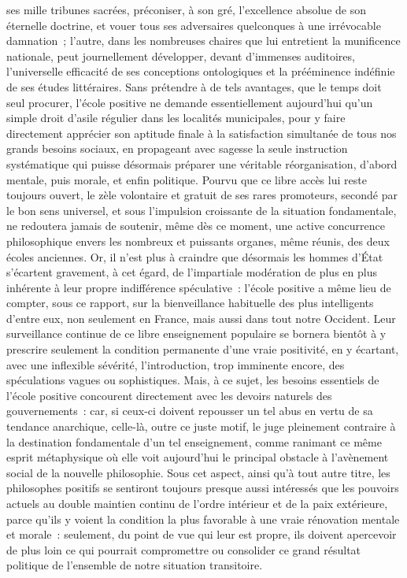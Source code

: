 \documentclass[french,twoside]{book} %
\begin{document}
ses mille tribunes sacrées, préconiser, à son gré, l’excellence absolue de son éternelle doctrine, et vouer tous ses adversaires quelconques à une irrévocable damnation ; l’autre, dans les nombreuses chaires que lui entretient la munificence nationale, peut journellement développer, devant d’immenses auditoires, l’universelle efficacité de ses conceptions ontologiques et la prééminence indéfinie de ses études littéraires. Sans prétendre à de tels avantages, que le temps doit seul procurer, l’école positive ne demande essentiellement aujourd’hui qu’un simple droit d’asile régulier dans les localités municipales, pour y faire directement apprécier son aptitude finale à la satisfaction simultanée de tous nos grands besoins sociaux, en propageant avec sagesse la seule instruction systématique qui puisse désormais préparer une véritable réorganisation, d’abord mentale, puis morale, et enfin politique. Pourvu que ce libre accès lui reste toujours ouvert, le zèle volontaire et gratuit de ses rares promoteurs, secondé par le bon sens universel, et sous l’impulsion croissante de la situation fondamentale, ne redoutera jamais de soutenir, même dès ce moment, une active concurrence philosophique envers les nombreux et puissants organes, même réunis, des deux écoles anciennes. Or, il n’est plus à craindre que désormais les hommes d’État s’écartent gravement, à cet égard, de l’impartiale modération de plus en plus inhérente à leur propre indifférence spéculative : l’école positive a même lieu de compter, sous ce rapport, sur la bienveillance habituelle des plus intelligents d’entre eux, non seulement en France, mais aussi dans tout notre Occident. Leur surveillance continue de ce libre enseignement populaire se bornera bientôt à y prescrire seulement la condition permanente d’une vraie positivité, en y écartant, avec une inflexible sévérité, l’introduction, trop imminente encore, des spéculations vagues ou sophistiques. Mais, à ce sujet, les besoins essentiels de l’école positive concourent directement avec les devoirs naturels des gouvernements : car, si ceux-ci doivent repousser un tel abus en vertu de sa tendance anarchique, celle-là, outre ce juste motif, le juge pleinement contraire à la destination fondamentale d’un tel enseignement, comme ranimant ce même esprit métaphysique où elle voit aujourd’hui le principal obstacle à l’avènement social de la nouvelle philosophie. Sous cet aspect, ainsi qu’à tout autre titre, les philosophes positifs se sentiront toujours presque aussi intéressés que les pouvoirs actuels au double maintien continu de l’ordre intérieur et de la paix extérieure, parce qu’ils y voient la condition la plus favorable à une vraie rénovation mentale et morale : seulement, du point de vue qui leur est propre, ils doivent apercevoir de plus loin ce qui pourrait compromettre ou consolider ce grand résultat politique de l’ensemble de notre situation transitoire.
\end{document}
